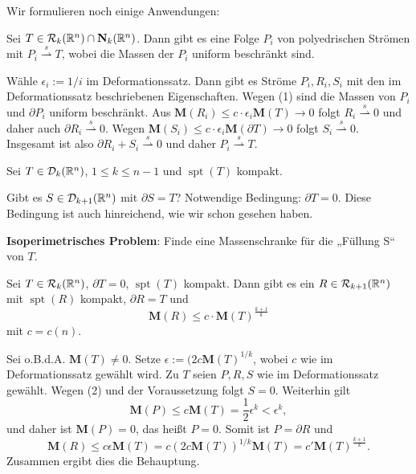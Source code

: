 \documentclass[a4paper,twoside,DIV15,BCOR12mm]{scrbook}
\newcommand{\MN}{\mathbf M}
\newcommand{\NS}{\mathbf N}
\DeclareMathOperator{\spt}{spt}
\begin{document}
Wir formulieren noch einige Anwendungen:



\begin{satz} Sei $T\in\mathcal R_k(\MdR^n) \cap \NS_k(\MdR^n)$. Dann gibt es eine Folge $P_i$ von polyedrischen Strömen mit $P_i \stackrel s\rightharpoonup T$, wobei die Massen der $P_i$ uniform beschränkt sind.
\end{satz}

\begin{beweis}
Wähle $\epsilon_i:=1/i$ im Deformationssatz. Dann gibt es Ströme $P_i,R_i,S_i$ mit den im Deformationssatz 
beschriebenen Eigenschaften. Wegen (1) sind die Massen von $P_i$ und $\partial P_i$ uniform beschränkt. 
Aus $\MN(R_i)\le c\cdot \epsilon_i\MN(T)\to 0$ folgt $R_i\stackrel s \rightharpoonup 0$ und daher auch 
$\partial R_i \stackrel s \rightharpoonup 0$. Wegen $\MN(S_i)\le c\cdot \epsilon_i\MN(\partial T)\to 0$ folgt $S_i\stackrel s \rightharpoonup 0$. Insgesamt ist also $\partial R_i+S_i \stackrel s \rightharpoonup 0$ und daher 
$P_i \stackrel s \rightharpoonup T$.
\end{beweis}

Sei $T\in\mathcal D_k(\mathbb{R}^n)$, $1\le k\le n-1$ und $\spt(T)$ kompakt.

Gibt es $S\in\mathcal D_{k+1}(\mathbb{R}^n)$ mit $\partial S=T$? Notwendige Bedingung: 
$\partial T = 0$. Diese Bedingung ist auch hinreichend, wie wir schon gesehen haben.

{\bf Isoperimetrisches Problem}: Finde eine Massenschranke für die „Füllung S“ von $T$.

\begin{satz} 
Sei $T\in\mathcal R_k(\mathbb{R}^n)$, $\partial T=0$, $\spt(T)$ kompakt. Dann gibt es ein $R\in\mathcal R_{k+1}(\mathbb{R}^n)$ mit $\spt(R)$ kompakt, $\partial R=T$ und
\[
\MN(R) \le c\cdot \MN(T)^{\frac {k+1}k}
\]
mit $c = c(n)$.
\end{satz}


\begin{beweis}
Sei o.B.d.A. $\MN(T)\neq 0$. Setze $\epsilon:= (2c\MN(T)^{1/k}$, wobei $c$ wie im 
Deformationssatz gewählt wird. Zu $T$ seien $P,R,S$ wie im Deformationssatz gewählt. 
Wegen (2) und der Voraussetzung folgt $S=0$. Weiterhin gilt
\[
\MN(P)\le c\MN(T)=\frac{1}{2}\epsilon^k<\epsilon^k,
\]
und daher ist $\MN(P)=0$, das heißt $P=0$. Somit ist $P=\partial R$ und
\[
\MN(R)\le c\epsilon\MN(T)=c(2c\MN(T))^{1/k}\MN(T)=c'\MN(T)^{\frac{k+1}{k}}.
\]
Zusammen ergibt dies die Behauptung.
\end{beweis}
\end{document}
